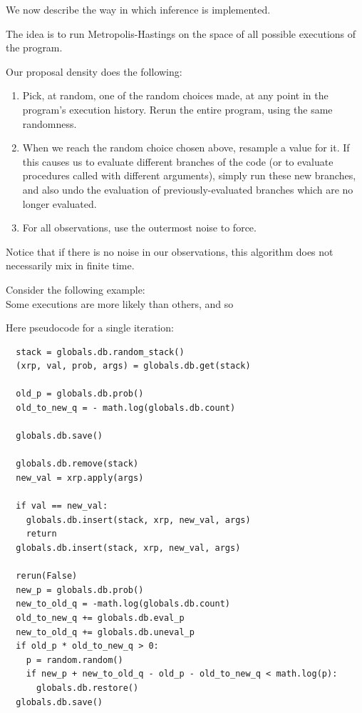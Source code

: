 \documentclass[11pt]{article}
\begin{document}
We now describe the way in which inference is implemented.  

The idea is to run Metropolis-Hastings on the space of all possible executions of the program.  

Our proposal density does the following:   
\begin{enumerate}
\item Pick, at random, one of the random choices made, at any point in the program's execution history.  Rerun the entire program, using the same randomness.  
\item When we reach the random choice chosen above, resample a value for it.  If this causes us to evaluate different branches of the code (or to evaluate procedures called with different arguments), simply run these new branches, and also undo the evaluation of previously-evaluated branches which are no longer evaluated.   
\item For all observations, use the outermost noise to force.  
\end{enumerate}

Notice that if there is no noise in our observations, this algorithm does not necessarily mix in finite time.  

Consider the following example: \\




Some executions are more likely than others, and so 

Here pseudocode for a single iteration:

\begin{verbatim}
  stack = globals.db.random_stack()
  (xrp, val, prob, args) = globals.db.get(stack)

  old_p = globals.db.prob()
  old_to_new_q = - math.log(globals.db.count)

  globals.db.save()

  globals.db.remove(stack)
  new_val = xrp.apply(args)

  if val == new_val:
    globals.db.insert(stack, xrp, new_val, args)
    return
  globals.db.insert(stack, xrp, new_val, args)

  rerun(False)
  new_p = globals.db.prob() 
  new_to_old_q = -math.log(globals.db.count) 
  old_to_new_q += globals.db.eval_p 
  new_to_old_q += globals.db.uneval_p 
  if old_p * old_to_new_q > 0:
    p = random.random()
    if new_p + new_to_old_q - old_p - old_to_new_q < math.log(p):
      globals.db.restore()
  globals.db.save()
\end{verbatim}
\end{document}

